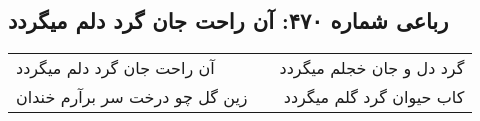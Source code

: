 \begin{center}
\section*{رباعی شماره ۴۷۰: آن راحت جان گرد دلم میگردد}
\label{sec:0470}
\begin{longtable}{l p{0.5cm} r}
آن راحت جان گرد دلم میگردد
&&
گرد دل و جان خجلم میگردد
\\
زین گل چو درخت سر برآرم خندان
&&
کاب حیوان گرد گلم میگردد
\\
\end{longtable}
\end{center}
